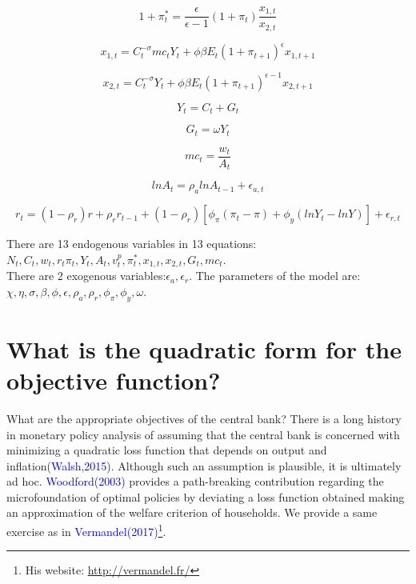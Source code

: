 \documentclass[cn,10pt,math=newtx,citestyle=gb7714-2015,bibstyle=gb7714-2015]{elegantbook}
\begin{document}
	\begin{equation}
		1+\pi_t^{*}=\frac{\epsilon}{\epsilon-1}(1+\pi_t)\frac{x_{1,t}}{x_{2,t}}
	\end{equation}
	
	\begin{equation}
		x_{1,t}=C_t^{-\sigma}mc_tY_t+\phi \beta E_t(1+\pi_{t+1})^{\epsilon}x_{1,t+1}
	\end{equation}
	
	\begin{equation}
		x_{2,t}=C_t^{-\sigma}Y_t+\phi \beta E_t(1+\pi_{t+1})^{\epsilon-1}x_{2,t+1}
	\end{equation}
	
	\begin{equation}
		Y_t=C_t+G_t
	\end{equation}
	
	\begin{equation}
		G_t=\omega Y_t
	\end{equation}
	
	\begin{equation}
		mc_{t}=\frac{w_t}{A_t}
	\end{equation}
	
	\begin{equation}
		lnA_t=\rho_a lnA_{t-1}+\epsilon_{a,t}
	\end{equation}
	
	\begin{equation}
		r_t=(1-\rho_r)r+\rho_r r_{t-1}+(1-\rho_r)\left[\phi_{\pi}(\pi_t-\pi)+\phi_y\left(lnY_t-lnY\right)\right]+\epsilon_{r,t}
	\end{equation}
	
	There are 13 endogenous variables in 13 equations:\\ $N_t,C_t,w_t,r_t \pi_t,Y_t,A_t,v_t^p,\pi_t^{*},x_{1,t},x_{2,t},G_t,mc_t$. \\There are 2 exogenous variables:$ \epsilon_a,\epsilon_r$. The parameters of the model are:\\$\chi,\eta,\sigma,\beta,\phi,\epsilon,\rho_a,\rho_r,\phi_{\pi},\phi_y,\omega$.
	
	\section{What is the quadratic form for the objective function?}
	
	What are the appropriate objectives of the central bank? There is a long history in monetary policy analysis of assuming that the central bank is concerned with minimizing a quadratic loss function that depends on output and inflation(\textcolor{blue}{Walsh,2015}). Although such an assumption is plausible, it is ultimately ad hoc. \textcolor{blue}{Woodford(2003)} provides a path-breaking contribution regarding the microfoundation of optimal policies by deviating a loss function obtained making an approximation of the welfare criterion of households. We provide a same exercise as in \textcolor{blue}{Vermandel(2017)}\footnote{His website: \url{http://vermandel.fr/}}.
	
\end{document}
